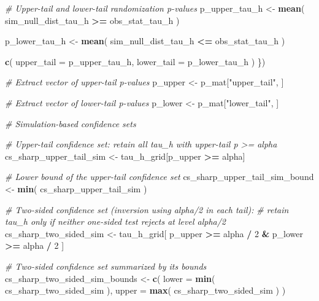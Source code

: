 \documentclass[
  12pt,
  leqno]{article}
\newenvironment{Shaded}{\begin{snugshade}}{\end{snugshade}}
\newcommand{\AttributeTok}[1]{\textcolor[rgb]{0.13,0.29,0.53}{#1}}
\newcommand{\CommentTok}[1]{\textcolor[rgb]{0.56,0.35,0.01}{\textit{#1}}}
\newcommand{\DecValTok}[1]{\textcolor[rgb]{0.00,0.00,0.81}{#1}}
\newcommand{\FunctionTok}[1]{\textcolor[rgb]{0.13,0.29,0.53}{\textbf{#1}}}
\newcommand{\NormalTok}[1]{#1}
\newcommand{\OtherTok}[1]{\textcolor[rgb]{0.56,0.35,0.01}{#1}}
\newcommand{\SpecialCharTok}[1]{\textcolor[rgb]{0.81,0.36,0.00}{\textbf{#1}}}
\newcommand{\StringTok}[1]{\textcolor[rgb]{0.31,0.60,0.02}{#1}}
\begin{document}
\begin{Shaded}
\begin{Highlighting}[]
                  \CommentTok{\# Upper{-}tail and lower{-}tail randomization p{-}values}
\NormalTok{                  p\_upper\_tau\_h }\OtherTok{\textless{}{-}} \FunctionTok{mean}\NormalTok{(}
\NormalTok{                    sim\_null\_dist\_tau\_h }\SpecialCharTok{\textgreater{}=}\NormalTok{ obs\_stat\_tau\_h}
\NormalTok{                  )}

\NormalTok{                  p\_lower\_tau\_h }\OtherTok{\textless{}{-}} \FunctionTok{mean}\NormalTok{(}
\NormalTok{                    sim\_null\_dist\_tau\_h }\SpecialCharTok{\textless{}=}\NormalTok{ obs\_stat\_tau\_h}
\NormalTok{                  )}

                  \FunctionTok{c}\NormalTok{(}
                    \AttributeTok{upper\_tail =}\NormalTok{ p\_upper\_tau\_h,}
                    \AttributeTok{lower\_tail =}\NormalTok{ p\_lower\_tau\_h}
\NormalTok{                  )}
\NormalTok{                \})}

\CommentTok{\# Extract vector of upper{-}tail p{-}values}
\NormalTok{p\_upper }\OtherTok{\textless{}{-}}\NormalTok{ p\_mat[}\StringTok{"upper\_tail"}\NormalTok{, ]}

\CommentTok{\# Extract vector of lower{-}tail p{-}values}
\NormalTok{p\_lower }\OtherTok{\textless{}{-}}\NormalTok{ p\_mat[}\StringTok{"lower\_tail"}\NormalTok{, ]}

\CommentTok{\# Simulation{-}based confidence sets}

\CommentTok{\# Upper{-}tail confidence set: retain all tau\_h with upper{-}tail p \textgreater{}= alpha}
\NormalTok{cs\_sharp\_upper\_tail\_sim }\OtherTok{\textless{}{-}}\NormalTok{ tau\_h\_grid[p\_upper }\SpecialCharTok{\textgreater{}=}\NormalTok{ alpha]}

\CommentTok{\# Lower bound of the upper{-}tail confidence set}
\NormalTok{cs\_sharp\_upper\_tail\_sim\_bound }\OtherTok{\textless{}{-}} \FunctionTok{min}\NormalTok{(}
\NormalTok{  cs\_sharp\_upper\_tail\_sim}
\NormalTok{)}

\CommentTok{\# Two{-}sided confidence set (inversion using alpha/2 in each tail):}
\CommentTok{\# retain tau\_h only if neither one{-}sided test rejects at level alpha/2}
\NormalTok{cs\_sharp\_two\_sided\_sim }\OtherTok{\textless{}{-}}\NormalTok{ tau\_h\_grid[}
\NormalTok{  p\_upper }\SpecialCharTok{\textgreater{}=}\NormalTok{ alpha }\SpecialCharTok{/} \DecValTok{2} \SpecialCharTok{\&}\NormalTok{ p\_lower }\SpecialCharTok{\textgreater{}=}\NormalTok{ alpha }\SpecialCharTok{/} \DecValTok{2}
\NormalTok{]}

\CommentTok{\# Two{-}sided confidence set summarized by its bounds}
\NormalTok{cs\_sharp\_two\_sided\_sim\_bounds }\OtherTok{\textless{}{-}} \FunctionTok{c}\NormalTok{(}
  \AttributeTok{lower =} \FunctionTok{min}\NormalTok{(}
\NormalTok{    cs\_sharp\_two\_sided\_sim}
\NormalTok{  ),}
  \AttributeTok{upper =} \FunctionTok{max}\NormalTok{(}
\NormalTok{    cs\_sharp\_two\_sided\_sim}
\NormalTok{  )}
\NormalTok{)}
\end{Highlighting}
\end{Shaded}
\end{document}
